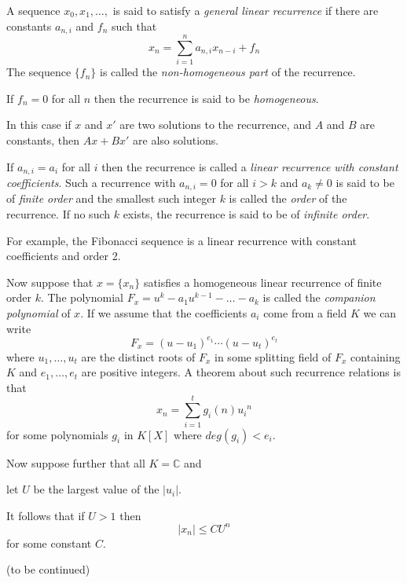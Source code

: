 \documentclass[12pt]{article}
\begin{document}
A sequence $x_0, x_1, \ldots,$ is said to satisfy a \emph{general linear recurrence} if there are constants $a_{n,i}$ and $f_n$ such that
$$
x_n = \sum_{i=1}^n a_{n,i} x_{n-i} + f_n
$$
The sequence $\{f_n\}$ is called the \emph{non-homogeneous part}
of the recurrence. 

If $f_n = 0$ for all $n$ then the recurrence is said to be \emph{homogeneous}.


In this case if $x$ and $x'$ are two solutions to the recurrence,
and $A$ and $B$ are constants, then $Ax +Bx'$ are also solutions.

If $a_{n,i} = a_i$ for all $i$ then the recurrence is called
a \emph{linear recurrence with constant coefficients}. Such a recurrence
with $a_{n,i} = 0$ for all $i>k$ and $a_k \ne 0$ is said to be of 
\emph{finite order} and the smallest such integer $k$ is called the
\emph{order} of the recurrence. If no such $k$ exists, the recurrence is
said to be of \emph{infinite order}.

For example, the Fibonacci sequence is a linear recurrence with constant coefficients and order 2.

Now suppose that $x=\{x_n\}$ satisfies a homogeneous linear recurrence of 
finite order $k$. The polynomial 
$F_x = u^k - a_1u^{k-1} - \ldots - a_k$ is called the \emph{companion polynomial}
of $x$. 
If we assume that the coefficients $a_i$ come from a field $K$ we can
write 
$$
F_x = (u-u_1)^{e_1} \cdots (u-u_t)^{e_t}
$$ 
where $u_1, \ldots , u_t$ are the distinct roots of $F_x$ in some
splitting field of $F_x$ containing $K$ and $e_1, \ldots , e_t$ are
positive integers. 
A theorem about such recurrence relations is that
$$
x_n = \sum_{i=1}^t g_i(n){u_i}^n
$$ 
for some polynomials $g_i$ in $K[X]$ where $deg(g_i) <e_i$.

Now suppose further that all $K=\mathbb{C}$ and 

let $U$ be the largest value of the $|u_i|$.

It follows that if $U>1$ then 
$$
|x_n| \le CU^n 
$$
for some constant $C$. 


(to be continued)

 
\end{document}
